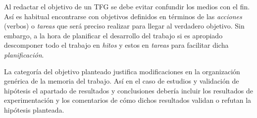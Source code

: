 Al redactar el objetivo de un TFG se debe evitar confundir los medios con el 
fin. Así es habitual encontrarse con objetivos definidos en términos de las 
\emph{acciones} (verbos) o \emph{tareas} que será preciso 
realizar para llegar al verdadero objetivo. Sin embargo, a la hora de 
planificar el desarrollo del trabajo si es apropiado descomponer todo el 
trabajo en \emph{hitos} y estos en \emph{tareas} para facilitar dicha 
\emph{planificación}.

La categoría del objetivo planteado justifica modificaciones en la organización genérica de la memoria del trabajo. Así en el caso de estudios y validación de hipótesis el apartado de resultados y conclusiones debería incluir los resultados de experimentación y los comentarios de cómo dichos resultados validan o refutan la hipótesis planteada.

